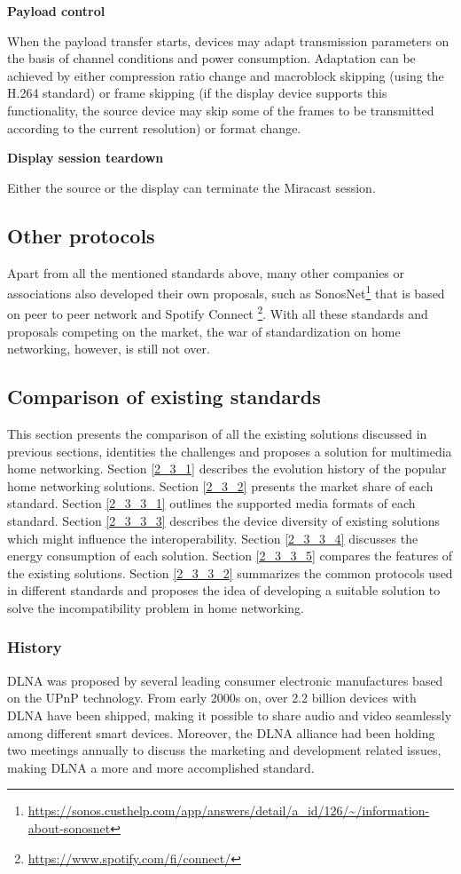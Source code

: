 \textbf{Payload control}

When the payload transfer starts, devices may adapt transmission parameters on
the basis of channel conditions and power consumption. Adaptation can be achieved by either compression ratio change and macroblock skipping (using the H.264 standard) or frame skipping (if the display device supports this functionality, the source device may skip some of the frames to be transmitted according to the current resolution) or format change.

\textbf{Display session teardown}

Either the source or the display can terminate the Miracast session.
\subsection{Other protocols\label{2_2_6}}
Apart from all the mentioned standards above, many other companies or associations 
also developed their own proposals, such as
SonosNet\footnote{\url{https://sonos.custhelp.com/app/answers/detail/a_id/126/~/information-about-sonosnet}} that is based on peer to peer network and Spotify Connect 
\footnote{\url{https://www.spotify.com/fi/connect/}}. With all these standards
and proposals competing on the market, the war of standardization on home
networking, however, is still not over.

\subsection{Comparison of existing standards\label{2_3}} 
This section presents the comparison of all the existing solutions discussed in
previous sections, identities the challenges and proposes a solution for
multimedia home networking. Section \ref{2_3_1} describes the evolution history
of the popular home networking solutions. Section \ref{2_3_2} presents the
market share of each standard. Section \ref{2_3_3_1} outlines the supported
media formats of each standard. Section \ref{2_3_3_3} describes the device
diversity of existing solutions which might influence the interoperability.
Section \ref{2_3_3_4} discusses the energy consumption of each solution. Section
\ref{2_3_3_5} compares the features of the existing solutions. Section
\ref{2_3_3_2} summarizes the common protocols used in different standards and
proposes the idea of developing a suitable solution to solve the
incompatibility problem in home networking.
\subsubsection{History\label{2_3_1}} 
DLNA was proposed by several leading consumer electronic manufactures based on
the UPnP technology. From early 2000s on, over 2.2 billion devices with DLNA
have been shipped, making it possible to share audio and video seamlessly among
different smart devices. Moreover, the DLNA alliance had been holding two
meetings annually to discuss the marketing and development related issues,
making DLNA a more and more accomplished standard.

